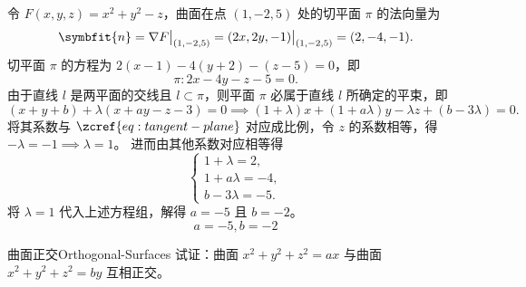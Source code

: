 \begin{solution}
    令 $F(x, y, z) = x^2 + y^2 - z$，曲面在点 $(1, -2, 5)$ 处的切平面 $\pi$ 的法向量为
    \begin{equation}
        \symbfit{n} = \nabla F \big|_{(1, -2, 5)} = (2x, 2y, -1) \big|_{(1, -2, 5)} = (2, -4, -1).
    \end{equation}
    切平面 $\pi$ 的方程为 $2(x - 1) - 4(y + 2) - (z - 5) = 0$，即
    \begin{equation}
        \pi: 2x - 4y - z - 5 = 0. \label{eq:tangent-plane}
    \end{equation}
    由于直线 $l$ 是两平面的交线且 $l \subset \pi$，则平面 $\pi$ 必属于直线 $l$ 所确定的平束，即
    \begin{equation}
        (x + y + b) + \lambda(x + ay - z - 3) = 0 \implies (1 + \lambda)x + (1 + a\lambda)y - \lambda z + (b - 3\lambda) = 0.
    \end{equation}
    将其系数与 $\zcref{eq:tangent-plane}$ 对应成比例，令 $z$ 的系数相等，得 $-\lambda = -1 \implies \lambda = 1$。
    进而由其他系数对应相等得
    \begin{equation}
        \begin{cases}
            1 + \lambda = 2,   \\
            1 + a\lambda = -4, \\
            b - 3\lambda = -5.
        \end{cases}
    \end{equation}
    将 $\lambda = 1$ 代入上述方程组，解得 $a = -5$ 且 $b = -2$。
    \begin{equation}
        \boxed{a = -5, b = -2}
    \end{equation}
\end{solution}


\begin{problem}{曲面正交}{Orthogonal-Surfaces}
    试证：曲面 $x^2 + y^2 + z^2 = ax$ 与曲面 $x^2 + y^2 + z^2 = by$ 互相正交。
\end{problem}

